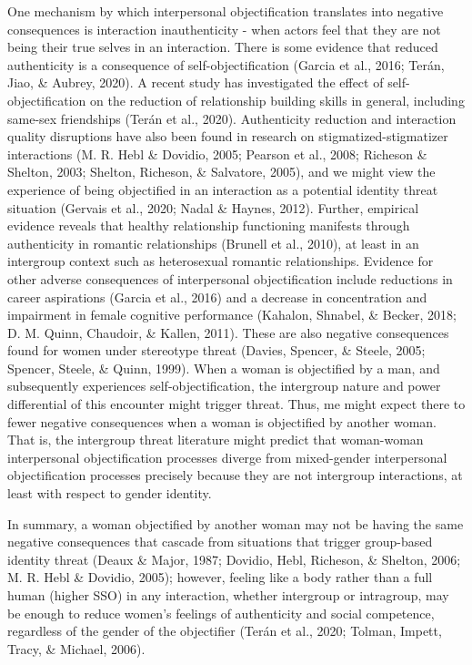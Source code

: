 \documentclass[man]{apa6}
\begin{document}
One mechanism by which interpersonal objectification translates into
negative consequences is interaction inauthenticity - when actors feel
that they are not being their true selves in an interaction. There is
some evidence that reduced authenticity is a consequence of
self-objectification (Garcia et al., 2016; Terán, Jiao, \& Aubrey,
2020). A recent study has investigated the effect of
self-objectification on the reduction of relationship building skills in
general, including same-sex friendships (Terán et al., 2020).
Authenticity reduction and interaction quality disruptions have also
been found in research on stigmatized-stigmatizer interactions (M. R.
Hebl \& Dovidio, 2005; Pearson et al., 2008; Richeson \& Shelton, 2003;
Shelton, Richeson, \& Salvatore, 2005), and we might view the experience
of being objectified in an interaction as a potential identity threat
situation (Gervais et al., 2020; Nadal \& Haynes, 2012). Further,
empirical evidence reveals that healthy relationship functioning
manifests through authenticity in romantic relationships (Brunell et
al., 2010), at least in an intergroup context such as heterosexual
romantic relationships. Evidence for other adverse consequences of
interpersonal objectification include reductions in career aspirations
(Garcia et al., 2016) and a decrease in concentration and impairment in
female cognitive performance (Kahalon, Shnabel, \& Becker, 2018; D. M.
Quinn, Chaudoir, \& Kallen, 2011). These are also negative consequences
found for women under stereotype threat (Davies, Spencer, \& Steele,
2005; Spencer, Steele, \& Quinn, 1999). When a woman is objectified by a
man, and subsequently experiences self-objectification, the intergroup
nature and power differential of this encounter might trigger threat.
Thus, me might expect there to fewer negative consequences when a woman
is objectified by another woman. That is, the intergroup threat
literature might predict that woman-woman interpersonal objectification
processes diverge from mixed-gender interpersonal objectification
processes precisely because they are not intergroup interactions, at
least with respect to gender identity.

In summary, a woman objectified by another woman may not be having the
same negative consequences that cascade from situations that trigger
group-based identity threat (Deaux \& Major, 1987; Dovidio, Hebl,
Richeson, \& Shelton, 2006; M. R. Hebl \& Dovidio, 2005); however,
feeling like a body rather than a full human (higher SSO) in any
interaction, whether intergroup or intragroup, may be enough to reduce
women's feelings of authenticity and social competence, regardless of
the gender of the objectifier (Terán et al., 2020; Tolman, Impett,
Tracy, \& Michael, 2006).
\end{document}

